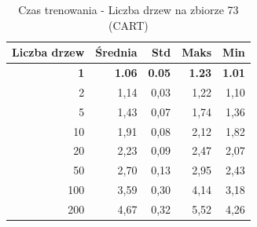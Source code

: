 \begin{table}[htbp]
\centering
\small
\setlength{\tabcolsep}{6pt}
\renewcommand{\arraystretch}{1.2}
\caption{Czas trenowania - Liczba drzew na zbiorze 73 (CART)}
\label{tab:CART_tree_count_73_time}
\begin{tabular}{r|r|r|r|r}
\toprule
Liczba drzew & Średnia & Std & Maks & Min \\
\hline
\textbf{1} & \textbf{1.06} & \textbf{0.05} & \textbf{1.23} & \textbf{1.01} \\
2 & 1,14 & 0,03 & 1,22 & 1,10 \\
5 & 1,43 & 0,07 & 1,74 & 1,36 \\
10 & 1,91 & 0,08 & 2,12 & 1,82 \\
20 & 2,23 & 0,09 & 2,47 & 2,07 \\
50 & 2,70 & 0,13 & 2,95 & 2,43 \\
100 & 3,59 & 0,30 & 4,14 & 3,18 \\
200 & 4,67 & 0,32 & 5,52 & 4,26 \\
\bottomrule
\end{tabular}
\end{table}